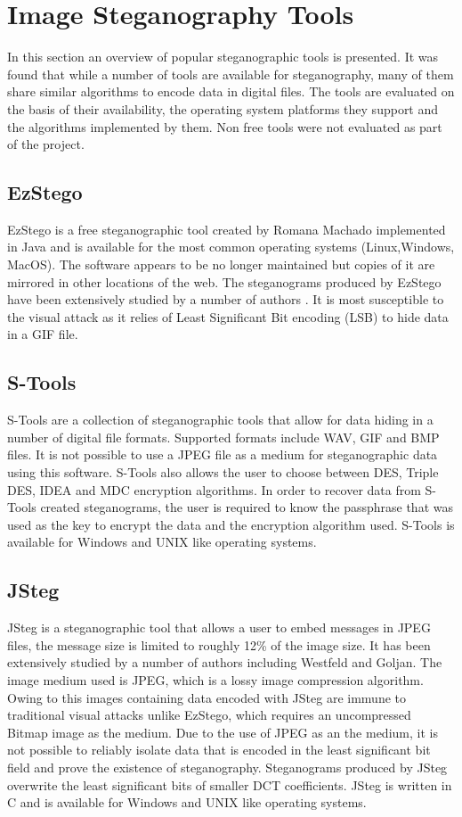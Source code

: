 \section{Image Steganography Tools}
\label{sec:tools}
In this section an overview of popular steganographic tools is presented. It was found that while a number of tools are available for steganography, many of them share similar algorithms to encode data in digital files.  The tools are evaluated on the basis of their availability, the operating system platforms they support and the algorithms implemented by them. Non free tools were not evaluated as part of the project. 
\subsection{EzStego}
EzStego \cite{ezstego} is a free steganographic tool created by Romana Machado  implemented in Java and is available for the most common operating systems (Linux,Windows, MacOS). The software appears to be no longer maintained but copies of it are mirrored in other locations of the web. The steganograms produced by EzStego have been extensively studied by a number of authors  \cite{westfeld2000attacks, farid2002detecting}. It is most susceptible to the visual attack as it relies of Least Significant Bit encoding (LSB) to hide data in a GIF file. 
\subsection{S-Tools}
S-Tools \cite{stools} are a collection of steganographic tools that allow for data hiding in a number of digital file formats. Supported formats include WAV, GIF and BMP files. It is not possible to use a JPEG file as a medium for steganographic data using this software.  S-Tools also allows the user to choose between DES, Triple DES, IDEA and MDC encryption algorithms. In order to recover data from S-Tools created steganograms,  the user is required to know the passphrase that was used as the key to encrypt the data and the encryption algorithm used.  S-Tools is available for Windows and UNIX like operating systems.
\subsection{JSteg} 
JSteg \cite{jsteg} is a steganographic tool that allows a user to embed messages in JPEG files, the message size is limited to roughly 12\% of the image size. It has been extensively studied by a number of authors including Westfeld and Goljan. The image medium used is JPEG, which is a lossy image compression algorithm. Owing to this images containing data encoded with JSteg are immune to traditional visual attacks unlike EzStego, which requires an uncompressed Bitmap image as the medium. Due to the use of JPEG as an the medium, it is not possible to reliably isolate data that is encoded in the least significant bit field and prove the existence of steganography. Steganograms produced by JSteg overwrite the least significant bits of smaller DCT coefficients. JSteg is written in C and is available for Windows and UNIX like operating systems.
